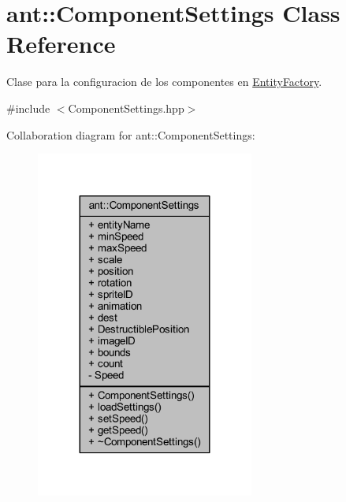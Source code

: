 \hypertarget{classant_1_1_component_settings}{\section{ant\+:\+:Component\+Settings Class Reference}
\label{classant_1_1_component_settings}
}


Clase para la configuracion de los componentes en \hyperlink{classant_1_1_entity_factory}{Entity\+Factory}.  




{\ttfamily \#include $<$Component\+Settings.\+hpp$>$}



Collaboration diagram for ant\+:\+:Component\+Settings\+:
\nopagebreak
\begin{figure}[H]
\begin{center}
\leavevmode
\includegraphics[width=203pt]{d4/d8f/classant_1_1_component_settings__coll__graph}
\end{center}
\end{figure}
